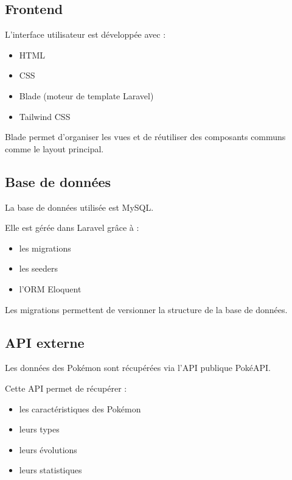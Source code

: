 \documentclass[a4paper,12pt]{article}
\begin{document}
    \subsection{Frontend}

    L’interface utilisateur est développée avec :

    \begin{itemize}
        \item HTML
        \item CSS
        \item Blade (moteur de template Laravel)
        \item Tailwind CSS
    \end{itemize}

    Blade permet d’organiser les vues et de réutiliser des composants communs comme le layout principal.

    \subsection{Base de données}

    La base de données utilisée est MySQL.

    Elle est gérée dans Laravel grâce à :

    \begin{itemize}
        \item les migrations
        \item les seeders
        \item l’ORM Eloquent
    \end{itemize}

    Les migrations permettent de versionner la structure de la base de données.

    \subsection{API externe}

    Les données des Pokémon sont récupérées via l’API publique PokéAPI.

    Cette API permet de récupérer :

    \begin{itemize}
        \item les caractéristiques des Pokémon
        \item leurs types
        \item leurs évolutions
        \item leurs statistiques
    \end{itemize}
\end{document}
